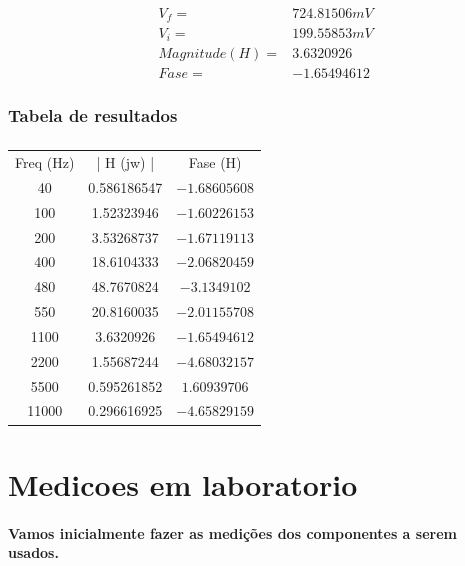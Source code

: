 \documentclass[12pt,twoside, a4paper, twocolumn]{article}
\begin{document}
\begin{equation*}
    \begin{aligned}
         & V_f =          & 724.81506mV \\
         & V_i =          & 199.55853mV \\
         & Magnitude(H) = & 3.6320926   \\
         & Fase =         & -1.65494612
    \end{aligned}
\end{equation*}



\subsubsection{Tabela de resultados}






\subparagraph*{}


\begin{center}
    \begin{tabular}{ |c|c|c| }
        \hline
        Freq (Hz) & | H (jw) |  & Fase (H)      \\
        40        & 0.586186547 & $-1.68605608$ \\
        100       & 1.52323946  & $-1.60226153$ \\
        200       & 3.53268737  & $-1.67119113$ \\
        400       & 18.6104333  & $-2.06820459$ \\
        480       & 48.7670824  & $-3.1349102$  \\
        550       & 20.8160035  & $-2.01155708$ \\
        1100      & 3.6320926   & $-1.65494612$ \\
        2200      & 1.55687244  & $-4.68032157$ \\
        5500      & 0.595261852 & $1.60939706$  \\
        11000     & 0.296616925 & $-4.65829159$ \\
        \hline
    \end{tabular}
\end{center}
\newpage
\section{Medicoes em laboratorio}


\paragraph{Vamos inicialmente fazer as medições dos componentes a serem usados.}
\end{document}
